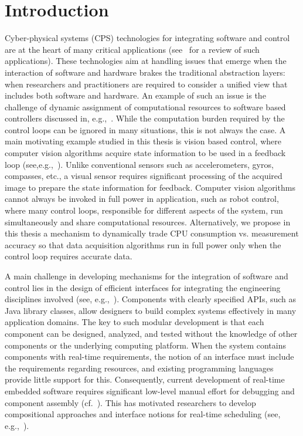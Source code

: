 \documentclass[ twoside, 12pt ]{article}
\begin{document}
\section{Introduction} %
Cyber-physical systems (CPS) technologies for integrating software and control are at the heart of many critical applications (see~\cite{lee2008cyber} for a review of such applications). These technologies aim at handling issues that emerge when the interaction of software and hardware brakes the traditional abstraction layers: when researchers and practitioners are required to consider a unified view that includes both software and hardware. An example of such an issue is the challenge of dynamic assignment of computational resources to software based controllers discussed in, e.g.,~\cite{arzen2000introduction,tabuada2007event,weiss2007automata}. While the computation burden required by the control loops can be ignored in many situations, this is not always the case. A main motivating example studied in this thesis is vision based control, where computer vision algorithms acquire state information to be used in a feedback loop (see,e.g.,~\cite{das2002vision,shakernia1999landing,Efraim2017}). Unlike conventional sensors such as accelerometers, gyros, compasses, etc., a visual sensor requires significant processing of the acquired image to prepare the state information for feedback. Computer vision algorithms cannot always be invoked in full power in application, such as robot control, where many control loops, responsible for different aspects of the system, run simultaneously and share computational resources. Alternatively, we propose in this thesis a mechanism to dynamically trade CPU consumption vs. measurement accuracy so that data acquisition algorithms run in full power only when the control loop requires accurate data.

A main challenge in developing mechanisms for the integration of software and control lies in the design of efficient interfaces for integrating the engineering disciplines involved (see, e.g.,~\cite{weiss2007automata}). Components with clearly specified APIs, such as Java library classes, allow designers to build complex systems effectively in many application domains.  The key to such modular development is that each component can be designed, analyzed, and tested without the knowledge of other components or the underlying computing platform. When the system contains components with real-time requirements, the notion of an interface must include the requirements regarding resources, and existing programming languages provide little support for this.  Consequently, current development of real-time embedded software requires significant low-level manual effort for debugging and component assembly (cf.~\cite{Lee00,IEEE03,HS06}). This has motivated researchers to develop compositional approaches and interface notions for real-time scheduling (see, e.g.,~\cite{RS01,dH01,MF01,CAHS03,SL08,SLBS04,TWS06,DBLP:conf/lctrts/AuerbachBIKRRT07}).
\end{document}
